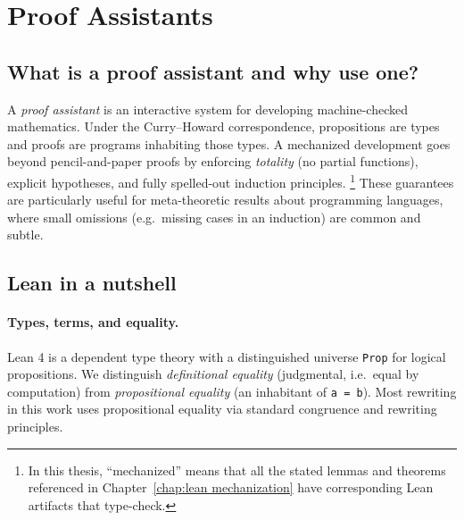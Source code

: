 \documentclass[12pt,a4paper,twoside]{book}
\begin{document}
\section{Proof Assistants}
\label{background:proofassistants}

\subsection{What is a proof assistant and why use one?}
A \emph{proof assistant} is an interactive system for developing machine-checked mathematics.
Under the Curry--Howard correspondence, propositions are types and proofs are programs inhabiting those types.
A mechanized development goes beyond pencil-and-paper proofs by enforcing \emph{totality} (no partial functions), explicit hypotheses, and fully spelled-out induction principles.%
\footnote{In this thesis, ``mechanized'' means that all the stated lemmas and theorems referenced in Chapter~\ref{chap:lean mechanization} have corresponding Lean artifacts that type-check.}
These guarantees are particularly useful for meta-theoretic results about programming languages, where small omissions (e.g.\ missing cases in an induction) are common and subtle.

\subsection{Lean in a nutshell}
\paragraph{Types, terms, and equality.}
Lean 4 is a dependent type theory with a distinguished universe \texttt{Prop} for logical propositions.
We distinguish \emph{definitional equality} (judgmental, i.e.\ equal by computation) from \emph{propositional equality} (an inhabitant of \texttt{a = b}).
Most rewriting in this work uses propositional equality via standard congruence and rewriting principles.
\end{document}
